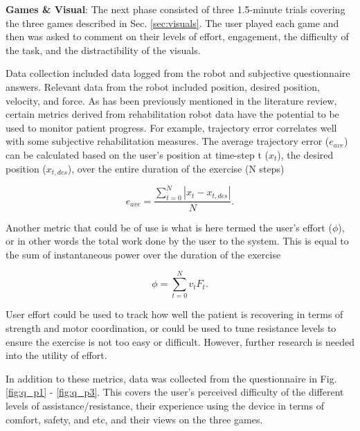 \documentclass[12pt]{report}
\begin{document}
\textbf{Games \& Visual}: The next phase consisted of three 1.5-minute trials covering the three games described in Sec. \ref{sec:visuals}. The user played each game and then was asked to comment on their levels of effort, engagement, the difficulty of the task, and the distractibility of the visuals. 

Data collection included data logged from the robot and subjective questionnaire answers. Relevant data from the robot included position, desired position, velocity, and force. As has been previously mentioned in the literature review, certain metrics derived from rehabilitation robot data have the potential to be used to monitor patient progress. For example, trajectory error correlates well with some subjective rehabilitation measures. The average trajectory error ($e_{ave}$) can be calculated based on the user's position at time-step t ($x_t$), the desired position ($x_{t,des}$), over the entire duration of the exercise (N steps)

\begin{equation} \label{eqn:error}
e_{ave} = \frac{\sum_{t=0}^{N} |x_t - x_{t,des}|}{N}.
\end{equation}

Another metric that could be of use is what is here termed the user's effort ($\phi$), or in other words the total work done by the user to the system. This is equal to the sum of instantaneous power over the duration of the exercise 

\begin{equation} \label{eqn:effort} 
\phi = \sum_{t=0}^{N} v_tF_t.
\end{equation}

User effort could be used to track how well the patient is recovering in terms of strength and motor coordination, or could be used to tune resistance levels to ensure the exercise is not too easy or difficult. However, further research is needed into the utility of effort. 

In addition to these metrics, data was collected from the questionnaire in Fig. \ref{fig:q_p1} - \ref{fig:q_p3}. This covers the user's perceived difficulty of the different levels of assistance/resistance, their experience using the device in terms of comfort, safety, and etc, and their views on the three games.
\end{document}
